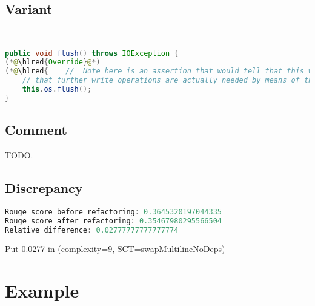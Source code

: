 \documentclass[11pt]{article}
\DeclareRobustCommand{\hlred}[1]{{\sethlcolor{YellowOrange}\hl{#1}}}
\begin{document}
\subsection{Variant}

\begin{lstlisting}[language=java]


public void flush() throws IOException {
(*@\hlred{Override}@*)
(*@\hlred{    //  Note here is an assertion that would tell that this writer knows now as is in case we detect}@*)
    // that further write operations are actually needed by means of the isOverflown() method.
    this.os.flush();
}
\end{lstlisting}

\subsection{Comment}

TODO.

\subsection{Discrepancy}

\begin{lstlisting}[language=java]
Rouge score before refactoring: 0.3645320197044335
Rouge score after refactoring: 0.35467980295566504
Relative difference: 0.02777777777777774
\end{lstlisting}

Put 0.0277 in (complexity=9, SCT=swapMultilineNoDeps)

\pagebreak
\section{Example}
\end{document}
